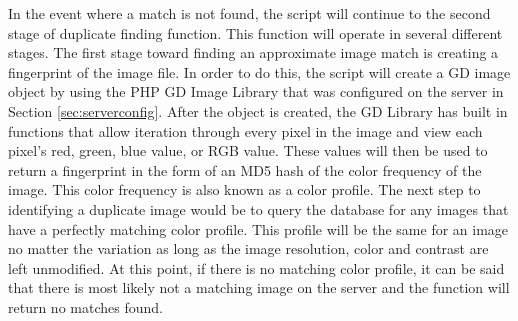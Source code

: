 In the event where a match is not found, the script will continue to the second stage of duplicate finding function. This function will operate in several different stages. The first stage toward finding an approximate image match is creating a fingerprint of the image file. In order to do this, the script will create a GD image object by using the PHP GD Image Library that was configured on the server in Section \ref{sec:serverconfig}. After the object is created, the GD Library has built in functions that allow iteration through every pixel in the image and view each pixel's red, green, blue value, or RGB value. These values will then be used to return a fingerprint in the form of an MD5 hash of the color frequency of the image. This color frequency is also known as a color profile. The next step to identifying a duplicate image would be to query the database for any images that have a perfectly matching color profile. This profile will be the same for an image no matter the variation as long as the image resolution, color and contrast are left unmodified. At this point, if there is no matching color profile, it can be said that there is most likely not a matching image on the server and
the function will return no matches found.

